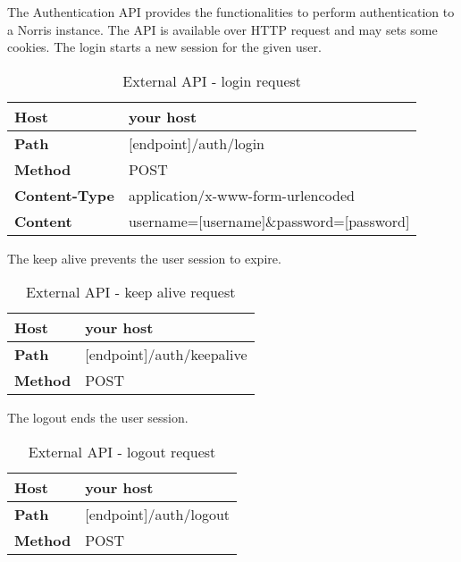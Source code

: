         The Authentication API provides the functionalities to perform authentication to a Norris instance. The API is available over HTTP request and may sets some cookies.
            The login starts a new session for the given user. \\
            \begin{table}[H]
                \centering
                \begin{tabu}{|l|l|}
                    \hline
                    \textbf{Host} & your host \\ \hline
                    \textbf{Path} & [endpoint]/auth/login \\ \hline
                    \textbf{Method} & POST \\ \hline
                    \textbf{Content-Type} & application/x-www-form-urlencoded \\ \hline
                    \textbf{Content} & username=[username]\&password=[password] \\ \hline
                \end{tabu}
                \caption{External API - login request}
            \end{table}
            The keep alive prevents the user session to expire. \\
            \begin{table}[H]
                \centering
                \begin{tabu}{|l|l|}
                    \hline
                    \textbf{Host} & your host \\ \hline
                    \textbf{Path} & [endpoint]/auth/keepalive \\ \hline
                    \textbf{Method} & POST \\ \hline
                \end{tabu}
                \caption{External API - keep alive request}
            \end{table}
            The logout ends the user session. \\
            \begin{table}[H]
                \centering
                \begin{tabu}{|l|l|}
                    \hline
                    \textbf{Host} & your host \\ \hline
                    \textbf{Path} & [endpoint]/auth/logout \\ \hline
                    \textbf{Method} & POST \\ \hline
                \end{tabu}
                \caption{External API - logout request}
            \end{table}